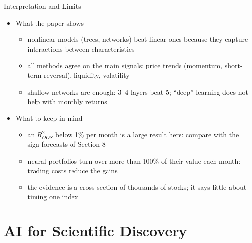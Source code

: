 \begin{frame}{Interpretation and Limits}
\itemsize{\small}
\begin{itemize}
    \item What the paper shows
    \begin{itemize}
        \item nonlinear models (trees, networks) beat linear ones because they capture interactions between characteristics
        \item all methods agree on the main signals: price trends (momentum, short-term reversal), liquidity, volatility
        \item shallow networks are enough: 3--4 layers beat 5; ``deep'' learning does not help with monthly returns
    \end{itemize}
    \item What to keep in mind
    \begin{itemize}
        \item an $R^2_{OOS}$ below 1\% per month is a large result here: compare with the sign forecasts of Section 8
        \item neural portfolios turn over more than 100\% of their value each month: trading costs reduce the gains
        \item the evidence is a cross-section of thousands of stocks; it says little about timing one index
    \end{itemize}
\end{itemize}
\end{frame}


\section{AI for Scientific Discovery}

